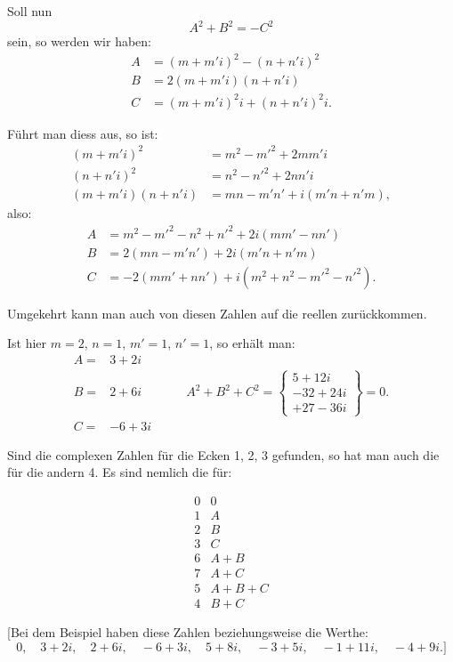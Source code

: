 
Soll nun
\[
A^2 + B^2 = -C^2
\]
sein, so werden wir haben:
\[\begin{aligned}
A &= (m+m'i)^2 - (n+n'i)^2 \\
B &= 2(m+m'i)(n+n'i) \\
C &= (m+m'i)^2 i + (n+n'i)^2 i.
\end{aligned}\]

Führt man diess aus, so ist:
\[\begin{aligned}
(m+m'i)^2 &= m^2 - m'^2 + 2mm'i \\
(n+n'i)^2 &= n^2 - n'^2 + 2nn'i \\
(m+m'i)(n+n'i) &= mn - m'n' + i(m'n+n'm),
\end{aligned}\]
also:
\[\begin{aligned}
A &= m^2 - m'^2 - n^2 + n'^2 + 2i(mm' - nn') \\
B &= 2(mn - m'n') + 2i(m'n+n'm) \\
C &= -2(mm'+nn') + i(m^2+n^2-m'^2-n'^2).
\end{aligned}\]

Umgekehrt kann man auch von diesen Zahlen auf die reellen zurückkommen.

Ist hier $m = 2$, $n = 1$, $m' = 1$, $n' = 1$, so erhält man:
\[
\begin{array}{lcl}
A = & 3+2i & \\
B = & 2+6i & \qquad A^2+B^2+C^2 = \left\{\begin{array}{r} 5+12i \\ -32+24i \\ +27-36i \end{array}\right\} = 0. \\
C = & -6+3i &
\end{array}
\]

 Sind die complexen Zahlen für die Ecken 1, 2, 3 gefunden, so hat man auch die für
die andern 4. Es sind nemlich die für:
\begin{center}\begin{minipage}{3.3cm}\[
\begin{array}{cc}
0 & 0 \\
1 & A \\
2 & B \\
3 & C \\
6 & A+B \\
7 & A+C \\
5 & A+B+C \\
4 & B+C
\end{array}
\]

\end{minipage}\hspace{.4cm}\begin{minipage}{7.1cm}\end{minipage}\end{center}

[Bei dem Beispiel haben diese Zahlen beziehungsweise die Werthe:
\[
0,\quad 3+2i,\quad 2+6i,\quad -6+3i,\quad 5+8i,\quad -3+5i,\quad -1+11i,\quad -4+9i.]
\]
